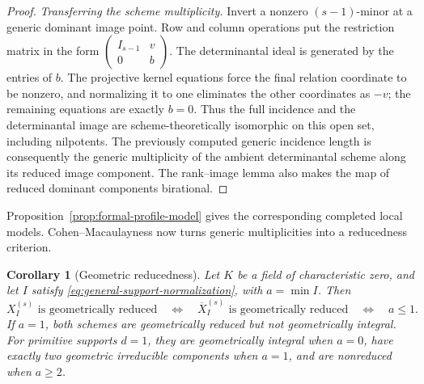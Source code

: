 \documentclass[10pt,fleqn]{article}
\numberwithin{equation}{section}
\newtheorem{corollary}[theorem]{Corollary}
\begin{document}
\begin{proof}
\emph{Transferring the scheme multiplicity.}
Invert a nonzero $(s-1)$-minor at a generic dominant image point.
Row and column operations put the restriction matrix in the form
$\left(\begin{smallmatrix}I_{s-1}&v\\0&b\end{smallmatrix}\right)$.
The determinantal ideal is generated by the entries of $b$.  The projective
kernel equations force the final relation coordinate to be nonzero, and
normalizing it to one eliminates the other coordinates as $-v$; the remaining
equations are exactly $b=0$.  Thus the full incidence and the determinantal
image are scheme-theoretically isomorphic on this open set, including
nilpotents.  The previously computed generic incidence length is consequently
the generic multiplicity of the ambient determinantal scheme along its reduced image component.  The rank--image lemma also makes the
map of reduced dominant components birational.
\end{proof}

Proposition~\ref{prop:formal-profile-model} gives the corresponding
completed local models.  Cohen--Macaulayness now turns generic
multiplicities into a reducedness criterion.

\begin{corollary}[Geometric reducedness]\label{cor:geometric-reducedness}
Let $K$ be a field of characteristic zero, and let $I$ satisfy
\eqref{eq:general-support-normalization}, with $a=\min I$.
Then
\[
 X_I^{(s)}\text{ is geometrically reduced}
 \quad\Longleftrightarrow\quad
 \overline X_I^{(s)}\text{ is geometrically reduced}
 \quad\Longleftrightarrow\quad a\le1.
\]
If $a=1$, both schemes are geometrically reduced but not geometrically
integral.  For primitive supports $d=1$, they are geometrically integral
when $a=0$, have exactly two geometric irreducible components when $a=1$,
and are nonreduced when $a\ge2$.
\end{corollary}
\end{document}
